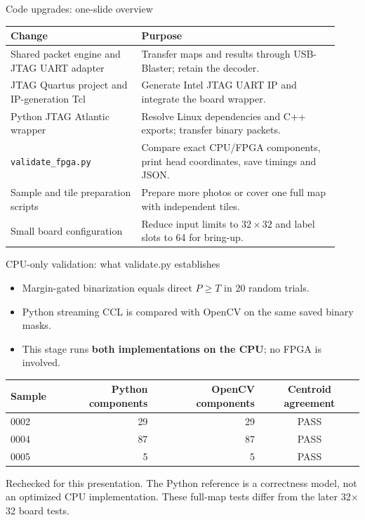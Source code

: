 \documentclass[aspectratio=169,10pt]{beamer}
\begin{document}
\begin{frame}{Code upgrades: one-slide overview}
\small
\begin{tabular}{p{0.37\linewidth}p{0.56\linewidth}}
\toprule
Change & Purpose \\
\midrule
Shared packet engine and JTAG UART adapter & Transfer maps and results through USB-Blaster; retain the decoder. \\
JTAG Quartus project and IP-generation Tcl & Generate Intel JTAG UART IP and integrate the board wrapper. \\
Python JTAG Atlantic wrapper & Resolve Linux dependencies and C++ exports; transfer binary packets. \\
\texttt{validate\_fpga.py} & Compare exact CPU/FPGA components, print head coordinates, save timings and JSON. \\
Sample and tile preparation scripts & Prepare more photos or cover one full map with independent tiles. \\
Small board configuration & Reduce input limits to $32\times32$ and label slots to 64 for bring-up. \\
\bottomrule
\end{tabular}
\end{frame}

\begin{frame}{CPU-only validation: what validate.py establishes}
\begin{itemize}
\item Margin-gated binarization equals direct $P\geq T$ in 20 random trials.
\item Python streaming CCL is compared with OpenCV on the same saved binary masks.
\item This stage runs \textbf{both implementations on the CPU}; no FPGA is involved.
\end{itemize}
\begin{center}
\begin{tabular}{lrrc}
\toprule
Sample & Python components & OpenCV components & Centroid agreement \\
\midrule
0002 & 29 & 29 & PASS \\
0004 & 87 & 87 & PASS \\
0005 & 5 & 5 & PASS \\
\bottomrule
\end{tabular}
\end{center}
\small Rechecked for this presentation. The Python reference is a correctness model, not an optimized CPU implementation. These full-map tests differ from the later 32$\times$32 board tests.
\end{frame}
\end{document}
